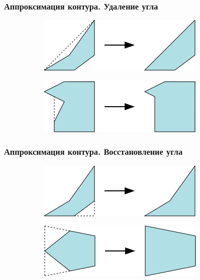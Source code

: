 \documentclass[10pt, unicode]{beamer}
\begin{document}
    \begin{frame}
        \frametitle{Аппроксимация контура. Удаление угла}
        \begin{figure}[H]
            \centering
            \begin{subfigure}[t]{\linewidth}
                \centering
                \includegraphics[scale=0.8]{images/earcut.png}
                \vspace*{1cm}
            \end{subfigure}
            \begin{subfigure}[b]{\linewidth}
                \centering
                \includegraphics[scale=0.8]{images/bendneighbor.png}
            \end{subfigure}
        \end{figure}
    \end{frame}
    \begin{frame}
        \frametitle{Аппроксимация контура. Восстановление угла}
        \begin{figure}[H]
            \begin{subfigure}[t]{\linewidth}
                \centering
                \includegraphics[scale=0.8]{images/bendneighbor2.png}
                \vspace*{1cm}
            \end{subfigure}
            \begin{subfigure}[t]{\linewidth}
                \centering
                \includegraphics[scale=0.8]{images/bendoutboth.png}
            \end{subfigure}
        \end{figure}
    \end{frame}
\end{document}
